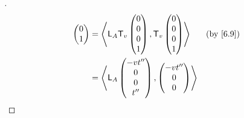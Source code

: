 \begin{proof}[]
\begin{align*}
{\begin{pmatrix}
                                            0 \\
                                            1
                                          \end{pmatrix}} & = \inn{\L_A \T_v\begin{pmatrix}
                                                                             0 \\
                                                                             0 \\
                                                                             0 \\
                                                                             1
                                                                           \end{pmatrix}, \T_v\begin{pmatrix}
                                                                                                0 \\
                                                                                                0 \\
                                                                                                0 \\
                                                                                                1
                                                                                              \end{pmatrix}} &  & \by{6.9} \\
                                         & = \inn{\L_A\begin{pmatrix}
                                                          -v t'' \\
                                                          0      \\
                                                          0      \\
                                                          t''
                                                        \end{pmatrix}, \begin{pmatrix}
                                                                         -v t'' \\
                                                                         0      \\
                                                                         0      \\

\end{pmatrix}}
\end{align*}
\end{proof}
